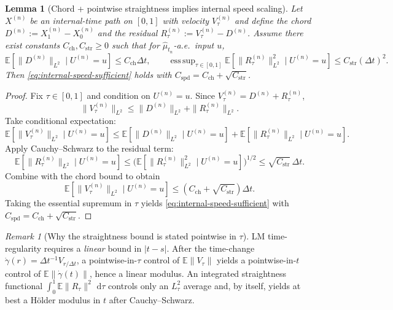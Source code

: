 \documentclass{article}
\numberwithin{equation}{section}
\theoremstyle{plain}
\newtheorem{lemma}[theorem]{Lemma}
\theoremstyle{definition}
\theoremstyle{remark}
\newtheorem{remark}[theorem]{Remark}
\newcommand{\E}{\mathbb{E}}
\newcommand{\dd}{\,\mathrm{d}}
\DeclareMathOperator*{\esssup}{ess\,sup}
\begin{document}
\begin{lemma}[Chord + pointwise straightness implies internal speed scaling]\label{lem:straightness-speed}
Let $X^{(n)}$ be an internal-time path on $[0,1]$ with velocity $V^{(n)}_\tau$ and define the chord
$D^{(n)}:=X^{(n)}_1-X^{(n)}_0$ and the residual $R^{(n)}_\tau:=V^{(n)}_\tau-D^{(n)}$.
Assume there exist constants $C_{\mathrm{ch}},C_{\mathrm{str}}\ge 0$ such that for $\widehat\mu_{t_n}$-a.e.\ input $u$,
\[
\E[\|D^{(n)}\|_{L^2}\mid U^{(n)}=u]\le C_{\mathrm{ch}}\Delta t,
\qquad
\esssup_{\tau\in[0,1]}\E[\|R^{(n)}_\tau\|_{L^2}^2\mid U^{(n)}=u]\le C_{\mathrm{str}}(\Delta t)^2.
\]
Then \eqref{eq:internal-speed-sufficient} holds with $C_{\mathrm{spd}}=C_{\mathrm{ch}}+\sqrt{C_{\mathrm{str}}}$.
\end{lemma}

\begin{proof}
Fix $\tau\in[0,1]$ and condition on $U^{(n)}=u$. Since $V^{(n)}_\tau=D^{(n)}+R^{(n)}_\tau$,
\[
\|V^{(n)}_\tau\|_{L^2}\le \|D^{(n)}\|_{L^2}+\|R^{(n)}_\tau\|_{L^2}.
\]
Take conditional expectation:
\[
\E[\|V^{(n)}_\tau\|_{L^2}\mid U^{(n)}=u]
\le
\E[\|D^{(n)}\|_{L^2}\mid U^{(n)}=u]
+
\E[\|R^{(n)}_\tau\|_{L^2}\mid U^{(n)}=u].
\]
Apply Cauchy--Schwarz to the residual term:
\[
\E[\|R^{(n)}_\tau\|_{L^2}\mid U^{(n)}=u]
\le
\Big(\E[\|R^{(n)}_\tau\|_{L^2}^2\mid U^{(n)}=u]\Big)^{1/2}
\le \sqrt{C_{\mathrm{str}}}\,\Delta t.
\]
Combine with the chord bound to obtain
\[
\E[\|V^{(n)}_\tau\|_{L^2}\mid U^{(n)}=u]\le (C_{\mathrm{ch}}+\sqrt{C_{\mathrm{str}}})\Delta t.
\]
Taking the essential supremum in $\tau$ yields \eqref{eq:internal-speed-sufficient} with $C_{\mathrm{spd}}=C_{\mathrm{ch}}+\sqrt{C_{\mathrm{str}}}$.
\end{proof}

\begin{remark}[Why the straightness bound is stated pointwise in $\tau$]
LM time-regularity requires a \emph{linear} bound in $|t-s|$. After the time-change
$\dot\gamma(r)=\Delta t^{-1}V_{r/\Delta t}$, a pointwise-in-$\tau$ control of $\E\|V_\tau\|$ yields a pointwise-in-$t$ control of
$\E\|\dot\gamma(t)\|$, hence a linear modulus. An integrated straightness functional $\int_0^1\E\|R_\tau\|^2\,\dd\tau$ controls only an
$L^2_\tau$ average and, by itself, yields at best a H\"older modulus in $t$ after Cauchy--Schwarz.
\end{remark}





\end{document}
